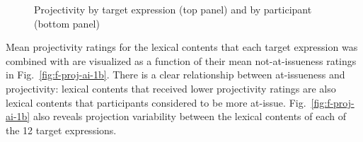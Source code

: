 \documentclass[11pt,fleqn]{article}
\newcommand{\6}{\mbox{$[\hspace*{-.6mm}[$}}
\newcommand{\9}{\mbox{$]\hspace*{-.6mm}]$}}
\newcommand{\figref}[1]{Fig.~\ref{#1}}
\begin{document}
\begin{figure}[!h]
\centering


	

\caption{Projectivity by target expression (top panel) and by participant (bottom panel)}
\label{fig:f-proj-1b}
\end{figure}



Mean projectivity ratings for the lexical contents that each target expression was combined with are visualized as a function of their mean not-at-issueness ratings in \figref{fig:f-proj-ai-1b}. There is a clear relationship between at-issueness and projectivity: lexical contents that received lower projectivity ratings are also lexical contents that participants considered to be more at-issue. \figref{fig:f-proj-ai-1b} also reveals projection variability between the lexical contents of each of the 12 target expressions.
\end{document}
